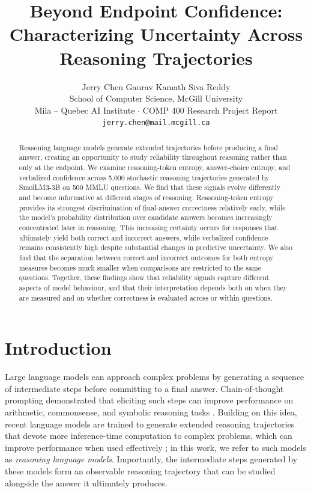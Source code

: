 \documentclass{article}
\title{Beyond Endpoint Confidence:\\
Characterizing Uncertainty Across Reasoning Trajectories}
\author{Jerry Chen \quad Gaurav Kamath \quad Siva Reddy \\
  School of Computer Science, McGill University \\
  Mila -- Quebec AI Institute \quad $\cdot$ \quad COMP 400 Research Project Report \\
  \texttt{jerry.chen@mail.mcgill.ca}}
\begin{document}
\maketitle

\begin{abstract}
Reasoning language models generate extended trajectories before producing a final answer, creating an opportunity to study reliability throughout reasoning rather than only at the endpoint. We examine reasoning-token entropy, answer-choice entropy, and verbalized confidence across 5{,}000 stochastic reasoning trajectories generated by SmolLM3-3B on 500 MMLU questions. We find that these signals evolve differently and become informative at different stages of reasoning. Reasoning-token entropy provides its strongest discrimination of final-answer correctness relatively early, while the model's probability distribution over candidate answers becomes increasingly concentrated later in reasoning. This increasing certainty occurs for responses that ultimately yield both correct and incorrect answers, while verbalized confidence remains consistently high despite substantial changes in predictive uncertainty. We also find that the separation between correct and incorrect outcomes for both entropy measures becomes much smaller when comparisons are restricted to the same questions. Together, these findings show that reliability signals capture different aspects of model behaviour, and that their interpretation depends both on when they are measured and on whether correctness is evaluated across or within questions.
\end{abstract}



\section{Introduction}
\label{sec:introduction}

Large language models can approach complex problems by generating a sequence of intermediate steps before committing to a final answer. Chain-of-thought prompting demonstrated that eliciting such steps can improve performance on arithmetic, commonsense, and symbolic reasoning tasks \cite{wei2022chain}. Building on this idea, recent language models are trained to generate extended reasoning trajectories that devote more inference-time computation to complex problems, which can improve performance when used effectively \cite{snell2025scaling,guo2025deepseek}; in this work, we refer to such models as \emph{reasoning language models}. Importantly, the intermediate steps generated by these models form an observable reasoning trajectory that can be studied alongside the answer it ultimately produces.
\end{document}
